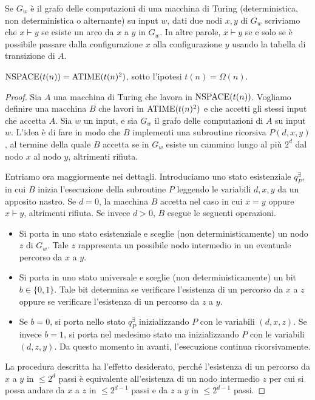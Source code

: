 Se $G_w$ è il grafo delle computazioni di una macchina di Turing (deterministica, non deterministica o alternante) su input $w$, dati due nodi $x,y$ di $G_w$ scriviamo che $x\vdash y$ se esiste un arco da $x$ a $y$ in $G_w$.
In altre parole, $x\vdash y$ se e solo se è possibile passare dalla configurazione $x$ alla configurazione $y$ usando la tabella di transizione di $A$.

\begin{teorema}
  \label{thm:nspace-atime}
  $\operatorname{NSPACE}(t(n)) = \operatorname{ATIME}(t(n)^2)$, sotto l'ipotesi $t(n) = \Omega(n)$.
\end{teorema}

\begin{proof}
  Sia $A$ una macchina di Turing che lavora in $\operatorname{NSPACE}(t(n))$. Vogliamo definire una macchina $B$ che lavori in $\operatorname{ATIME}(t(n)^2)$ e che accetti gli stessi input che accetta $A$.
  Sia $w$ un input, e sia $G_w$ il grafo delle computazioni di $A$ su input $w$.
  L'idea è di fare in modo che $B$ implementi una subroutine ricorsiva $P(d,x,y)$, al termine della quale $B$ accetta se in $G_w$ esiste un cammino lungo al più $2^d$ dal nodo $x$ al nodo $y$, altrimenti rifiuta.
  
  Entriamo ora maggiormente nei dettagli. Introduciamo uno stato esistenziale $q_P^\exists$, in cui $B$ inizia l'esecuzione della subroutine $P$ leggendo le variabili $d,x,y$ da un apposito nastro.
  Se $d=0$, la macchina $B$ accetta nel caso in cui $x=y$ oppure $x\vdash y$, altrimenti rifiuta.
  Se invece $d>0$, $B$ esegue le seguenti operazioni.
  \begin{itemize}
    \item Si porta in uno stato esistenziale e sceglie (non deterministicamente) un nodo $z$ di $G_w$.
    Tale $z$ rappresenta un possibile nodo intermedio in un eventuale percorso da $x$ a $y$.
    \item Si porta in uno stato universale e sceglie (non deterministicamente) un bit $b\in\{0,1\}$.
    Tale bit determina se verificare l'esistenza di un percorso da $x$ a $z$ oppure se verificare l'esistenza di un percorso da $z$ a $y$.
    \item Se $b=0$, si porta nello stato $q_P^\exists$ inizializzando $P$ con le variabili $(d,x,z)$. Se invece $b=1$, si porta nel medesimo stato ma inizializzando $P$ con le variabili $(d,z,y)$.
    Da questo momento in avanti, l'esecuzione continua ricorsivamente.
  \end{itemize}
  La procedura descritta ha l'effetto desiderato, perché l'esistenza di un percorso da $x$ a $y$ in $\leq 2^d$ passi è equivalente all'esistenza di un nodo intermedio $z$ per cui si possa andare da $x$ a $z$ in $\leq 2^{d-1}$ passi e da $z$ a $y$ in $\leq 2^{d-1}$ passi.
  

\end{proof}
